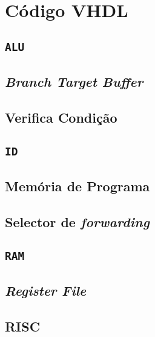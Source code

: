 \appendix
\section{Código VHDL}

\subsection{\texttt{ALU}}


\pagebreak

\subsection{\textit{Branch Target Buffer}}


\pagebreak

\subsection{Verifica Condição}


\pagebreak

\subsection{\texttt{ID}}


\pagebreak

\subsection{Memória de Programa}


\pagebreak

\subsection{Selector de \textit{forwarding}}


\pagebreak

\subsection{\texttt{RAM}}


\pagebreak

\subsection{\textit{Register File}}


\pagebreak

\subsection{\textmu RISC}

